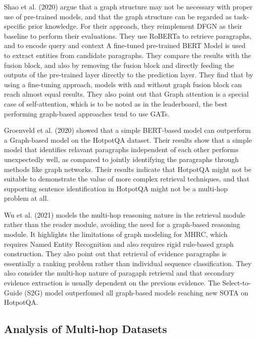 \documentclass[sigplan,screen]{acmart}
\begin{document}
Shao et al. (2020) \cite{RN127} argue that a graph structure may not be necessary with proper use of pre-trained models, and that the graph 
structure can be regarded as task-specific prior knowledge. For their approach, they reimplement DFGN \cite{RN122} as their baseline to perform 
their evaluations. They use RoBERTa \cite{RN171} to retrieve paragraphs, and to encode query and context A fine-tuned pre-trained BERT Model 
is used to extract entities from candidate paragraphs. They compare the results with the fusion block, and also by removing the fusion block 
and directly feeding the outputs of the pre-trained layer directly to the prediction layer. They find that by using a fine-tuning approach, 
models with and without graph fusion block can reach almost equal results. They also point out that Graph 
attention is a special case of self-attention, which is to be noted as in the leaderboard, the best performing graph-based approaches tend 
to use GATs.

Groenveld et al. (2020) \cite{RN126} showed that a simple BERT-based model can outperform a Graph-based model on the HotpotQA dataset.
Their results show that a simple model that identifies relavant paragraphs independent of each other performs unexpectedly well, as compared to 
jointly identifying the paragraphs through methods like graph networks. Their results indicate that HotpotQA might not be suitable to 
demonstrate the value of more complex retrieval techniques, and that supporting sentence identification in HotpotQA might not be a multi-hop 
problem at all.

Wu et al. (2021) \cite{RN106} models the multi-hop reasoning nature in the retrieval module rather than the reader module, avoiding the need 
for a graph-based reasoning module. It highlights the limitations of graph modeling for MHRC, which requires Named Entity Recognition and 
also requires rigid rule-based graph construction. They also point out that retrieval of evidence paragraphs is essentially a ranking problem 
rather than individual sequence classification. They also consider the multi-hop nature of paragaph retrieval and that secondary evidence 
extraction is usually dependent on the previous evidence. The Select-to-Guide (S2G) model outperfomed all graph-based models reaching new 
SOTA on HotpotQA.



\subsection{Analysis of Multi-hop Datasets}
\end{document}
